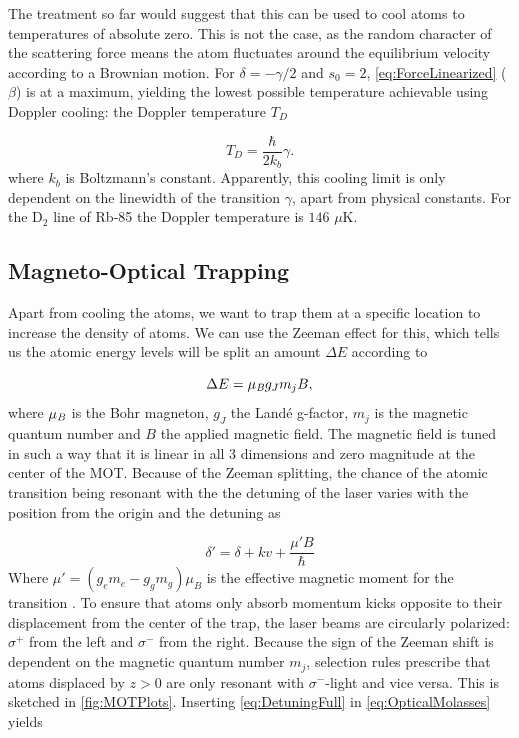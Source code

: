 The treatment so far would suggest that this can be used to cool atoms to temperatures of absolute zero. 
This is not the case, as the random character of the scattering force means the atom fluctuates around the equilibrium velocity according to a Brownian motion. 
For $\delta=-\gamma/2$ and $s_0 =2$, \cref{eq:ForceLinearized} ($\beta$) is at a maximum, yielding the lowest possible temperature achievable using Doppler cooling: the Doppler temperature $T_D$ \cite{Metcalf1999}

\begin{equation}\label{eq:DopplerTemperature}
	T_D = \frac{\hbar}{2k_b} \gamma.
\end{equation}
where $k_b$ is Boltzmann's constant. Apparently, this cooling limit is only dependent on the linewidth of the transition $\gamma$, apart from physical constants. 
For the D$_2$ line of Rb-85 the Doppler temperature is $146$ $\mu$K.

\subsection{Magneto-Optical Trapping}

Apart from cooling the atoms, we want to trap them at a specific location to increase the density of atoms. 
We can use the Zeeman effect for this, which tells us the atomic energy levels will be split an amount $\Delta E$ according to \cite{Griffiths2004}

\begin{equation}\label{eq:Zeeman}
	\Delta E = \mu_{\emph{B}} g_J m_j B,
\end{equation}
where $\mu_{\emph{B}}$ is the Bohr magneton, $g_J$ the Landé g-factor, $m_j$ is the magnetic quantum number and $B$ the applied magnetic field. 
The magnetic field is tuned in such a way that it is linear in all 3 dimensions and zero magnitude at the center of the \ac{MOT}.
Because of the Zeeman splitting, the chance of the atomic transition being resonant with the the detuning of the laser varies with the position from the origin and the detuning as \cite{Kowalski2010}

\begin{equation}\label{eq:DetuningFull}
	\delta' = \delta + k v + \frac{\mu'B}{\hbar}
\end{equation}
Where $\mu' = (g_e m_e-g_g m_g)\mu_B$ is the effective magnetic moment for the transition \cite{Kowalski2010}. 
To ensure that atoms only absorb momentum kicks opposite to their displacement from the center of the trap, the laser beams are circularly polarized: $\sigma^+$ from the left and $\sigma^-$ from the right. 
Because the sign of the Zeeman shift is dependent on the magnetic quantum number $m_j$, selection rules prescribe that atoms displaced by $z>0$ are only resonant with $\sigma^-$-light and vice versa.
This is sketched in \cref{fig:MOTPlots}. Inserting \cref{eq:DetuningFull} in \cref{eq:OpticalMolasses} yields


